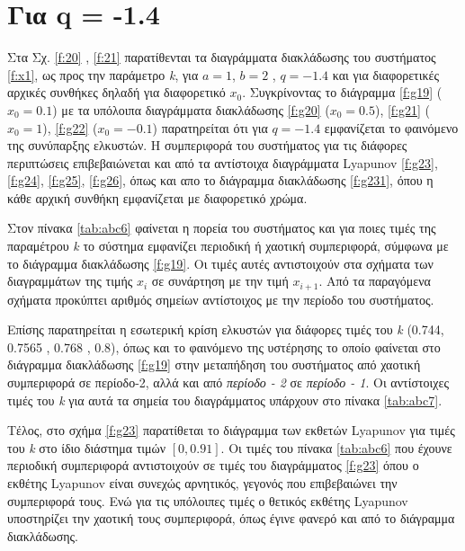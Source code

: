 \section{Για q = -1.4}
Στα Σχ. \ref{f:20} , \ref{f:21} παρατίθενται τα διαγράμματα διακλάδωσης του συστήματος \ref{f:x1}, ως προς την παράμετρο \emph{k}, για $a = 1$, $b = 2$ , $q =- 1.4$ και για διαφορετικές αρχικές συνθήκες δηλαδή για διαφορετικό \(x_0\). Συγκρίνοντας το διάγραμμα \ref{f:g19} (\(x_0=0.1\)) με τα υπόλοιπα διαγράμματα διακλάδωσης \ref{f:g20} (\(x_0=0.5\)), \ref{f:g21} (\(x_0=1\)), \ref{f:g22} (\(x_0=-0.1\)) παρατηρείται ότι για $q=-1.4$ εμφανίζεται το φαινόμενο της συνύπαρξης ελκυστών. Η συμπεριφορά του συστήματος για τις διάφορες περιπτώσεις επιβεβαιώνεται και από τα αντίστοιχα διαγράμματα Lyapunov \ref{f:g23}, \ref{f:g24}, \ref{f:g25}, \ref{f:g26},
όπως και απο το διάγραμμα διακλάδωσης \ref{f:g231}, όπου η κάθε αρχική συνθήκη εμφανίζεται με διαφορετικό χρώμα.

Στον πίνακα \ref{tab:abc6} φαίνεται η πορεία του συστήματος και για ποιες τιμές της παραμέτρου \emph{k} το σύστημα εμφανίζει περιοδική ή χαοτική συμπεριφορά, σύμφωνα με το διάγραμμα διακλάδωσης \ref{f:g19}. Οι τιμές αυτές αντιστοιχούν στα σχήματα των διαγραμμάτων της τιμής \(x_i\) σε συνάρτηση με την τιμή \(x_{i+1}\). Από τα παραγόμενα σχήματα προκύπτει αριθμός σημείων αντίστοιχος με την περίοδο του συστήματος.

Επίσης παρατηρείται η εσωτερική κρίση ελκυστών για διάφορες τιμές του \emph{k} (0.744, 0.7565 , 0.768 , 0.8), όπως και το φαινόμενο της υστέρησης το οποίο φαίνεται στο διάγραμμα διακλάδωσης \ref{f:g19} στην μεταπήδηση του συστήματος από χαοτική συμπεριφορά σε περίοδο-2, αλλά και από \emph{περίοδο - 2} σε \emph{περίοδο - 1}. Οι αντίστοιχες τιμές του \emph{k} για αυτά τα σημεία του διαγράμματος υπάρχουν στο πίνακα \ref{tab:abc7}.

Τέλος, στο σχήμα \ref{f:g23} παρατίθεται το διάγραμμα των εκθετών Lyapunov για τιμές του \emph{k} στο ίδιο διάστημα τιμών $[0, 0.91]$. Οι τιμές του πίνακα \ref{tab:abc6} που έχουνε περιοδική συμπεριφορά αντιστοιχούν σε τιμές του διαγράμματος \ref{f:g23} όπου ο εκθέτης Lyapunov είναι συνεχώς αρνητικός, γεγονός που επιβεβαιώνει την συμπεριφορά τους. Ενώ για τις υπόλοιπες τιμές ο θετικός εκθέτης Lyapunov υποστηρίζει την χαοτική τους συμπεριφορά, όπως έγινε φανερό και από το διάγραμμα διακλάδωσης.


